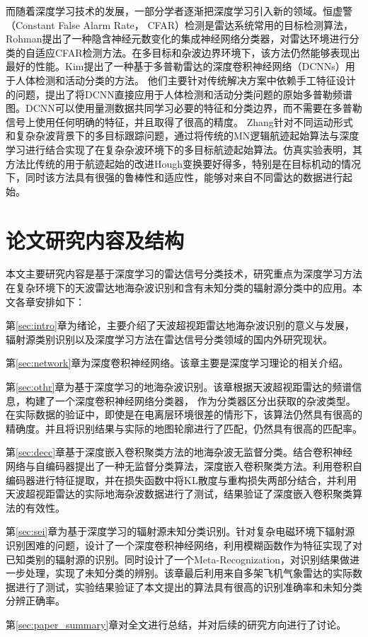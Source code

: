 而随着深度学习技术的发展，一部分学者逐渐把深度学习引入新的领域。恒虚警（Constant False Alarm Rate， CFAR）检测是雷达系统常用的目标检测算法，Rohman提出了一种隐含神经元数变化的集成神经网络分类器，对雷达环境进行分类的自适应CFAR检测方法。在多目标和杂波边界环境下，该方法仍然能够表现出最好的性能。Kim提出了一种基于多普勒雷达的深度卷积神经网络（DCNNs）用于人体检测和活动分类的方法。 他们主要针对传统解决方案中依赖手工特征设计的问题，提出了将DCNN直接应用于人体检测和活动分类问题的原始多普勒频谱图。DCNN可以使用量测数据共同学习必要的特征和分类边界，而不需要在多普勒信号上使用任何明确的特征，并且取得了很高的精度。
Zhang针对不同运动形式和复杂杂波背景下的多目标跟踪问题，通过将传统的MN逻辑航迹起始算法与深度学习进行结合实现了在复杂杂波环境下的多目标航迹起始算法。仿真实验表明，其方法比传统的用于航迹起始的改进Hough变换要好得多，特别是在目标机动的情况下，同时该方法具有很强的鲁棒性和适应性，能够对来自不同雷达的数据进行起始。


\section{论文研究内容及结构}

本文主要研究内容是基于深度学习的雷达信号分类技术，研究重点为深度学习方法在复杂环境下的天波雷达地海杂波识别和含有未知分类的辐射源分类中的应用。本文各章安排如下：

第\ref{sec:intro}章为绪论，主要介绍了天波超视距雷达地海杂波识别的意义与发展，辐射源类别识别以及深度学习方法在雷达信号分类领域的国内外研究现状。

第\ref{sec:network}章为深度卷积神经网络。该章主要是深度学习理论的相关介绍。

第\ref{sec:othr}章为基于深度学习的地海杂波识别。该章根据天波超视距雷达的频谱信息，构建了一个深度卷积神经网络分类器，
作为分类器区分出获取的杂波类型。在实际数据的验证中，即使是在电离层环境很差的情形下，该算法仍然具有很高的精确度。并且将识别结果与实际的地图轮廓进行了匹配，仍然具有很高的匹配率。

第\ref{sec:decc}章基于深度嵌入卷积聚类方法的地海杂波无监督分类。结合卷积神经网络与自编码器提出了一种无监督分类算法，深度嵌入卷积聚类方法。利用卷积自编码器进行特征提取，并在损失函数中将KL散度与重构损失两部分结合，并利用天波超视距雷达的实际地海杂波数据进行了测试，结果验证了深度嵌入卷积聚类算法的有效性。

第\ref{sec:sei}章为基于深度学习的辐射源未知分类识别。针对复杂电磁环境下辐射源识别困难的问题，设计了一个深度卷积神经网络，利用模糊函数作为特征实现了对已知类别的辐射源的识别。同时设计了一个Meta-Recognization，对识别结果做进一步处理，实现了未知分类的辨别。该章最后利用来自多架飞机气象雷达的实际数据进行了测试，实验结果验证了本文提出的算法具有很高的识别准确率和未知分类分辨正确率。

第\ref{sec:paper_summary}章对全文进行总结，并对后续的研究方向进行了讨论。